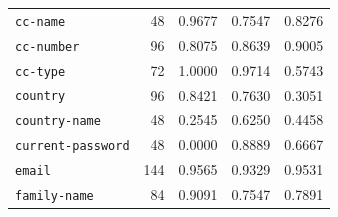 \begin{longtable}{lrrrr}
\texttt{cc-name} & 48 & 0.9677 & 0.7547 & 0.8276 \\  %
\texttt{cc-number} & 96 & 0.8075 & 0.8639 & 0.9005 \\  %
\texttt{cc-type} & 72 & 1.0000 & 0.9714 & 0.5743 \\  %
\texttt{country} & 96 & 0.8421 & 0.7630 & 0.3051 \\  %
\texttt{country-name} & 48 & 0.2545 & 0.6250 & 0.4458 \\  %
\texttt{current-password} & 48 & 0.0000 & 0.8889 & 0.6667 \\  %
\texttt{email} & 144 & 0.9565 & 0.9329 & 0.9531 \\  %
\texttt{family-name} & 84 & 0.9091 & 0.7547 & 0.7891 \\  %

\end{longtable}
